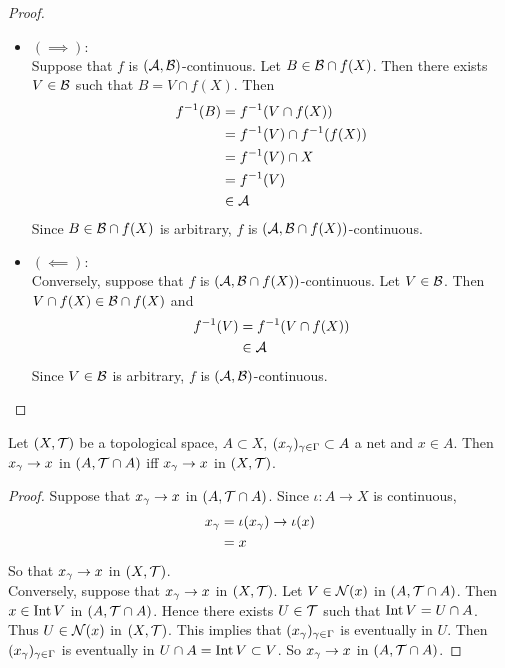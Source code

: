 \documentclass{book}
\begin{document}
\begin{proof}\
	\begin{itemize}
		\item $(\implies):$ \\
		Suppose that $f$ is $(\mathcal{A}, \mathcal{B})$-continuous. Let $B \in \mathcal{B} \cap f(X)$. Then there exists $V \in \mathcal{B}$ such that $B = V \cap f(X)$. Then 
		\begin{align*}
			f^{-1}(B)
			& = f^{-1}(V \cap f(X)) \\
			& = f^{-1}(V) \cap f^{-1}(f(X)) \\
			& = f^{-1}(V) \cap X \\
			& = f^{-1}(V) \\
			& \in \mathcal{A}
		\end{align*}
		Since $B \in \mathcal{B} \cap f(X)$ is arbitrary, $f$ is  $(\mathcal{A}, \mathcal{B} \cap f(X))$-continuous. 
		\item $(\impliedby):$ \\
		Conversely, suppose that $f$ is  $(\mathcal{A}, \mathcal{B} \cap f(X))$-continuous. Let $V \in \mathcal{B}$. Then $V \cap f(X) \in \mathcal{B} \cap f(X)$ and 
		\begin{align*}
			f^{-1}(V)
			& = f^{-1}(V \cap f(X)) \\
			& \in \mathcal{A}  
		\end{align*} 
		Since $V \in \mathcal{B}$ is arbitrary, $f$ is  $(\mathcal{A}, \mathcal{B})$-continuous. 
	\end{itemize}
\end{proof}

\begin{ex}
	Let $(X, \mathcal{T})$ be a topological space, $A \subset X$, $(x_{\gamma})_{\gamma \in \Gamma} \subset A$ a net and $x \in A$. Then $x_{\gamma} \rightarrow x$ in $(A,\mathcal{T} \cap A)$ iff $x_{\gamma} \rightarrow x$ in $(X,\mathcal{T})$.
\end{ex}

\begin{proof}
	Suppose that $x_{\gamma} \rightarrow x$ in $(A,\mathcal{T} \cap A)$. Since $\iota: A \rightarrow X$ is continuous, 
	\begin{align*}
		x_{\gamma} 
		&= \iota(x_{\gamma}) \rightarrow \iota(x) \\
		&= x
	\end{align*}
	So that $x_{\gamma} \rightarrow x$ in $(X,\mathcal{T})$. \\
	Conversely, suppose that $x_{\gamma} \rightarrow x$ in $(X,\mathcal{T})$. Let $V \in \mathcal{N}(x)$ in $(A, \mathcal{T} \cap A)$. Then $x \in \operatorname{Int} V$ in  $(A, \mathcal{T} \cap A)$. Hence there exists $U \in \mathcal{T}$ such that $\operatorname{Int} V = U \cap A$. Thus $U \in \mathcal{N}(x)$ in $(X, \mathcal{T})$. This implies that $(x_{\gamma})_{\gamma \in \Gamma}$ is eventually in $U$. Then $(x_{\gamma})_{\gamma \in \Gamma}$ is eventually in $U \cap A = \operatorname{Int} V \subset V$. So $x_{\gamma} \rightarrow x$ in $(A, \mathcal{T} \cap A)$.  
\end{proof}
\end{document}
